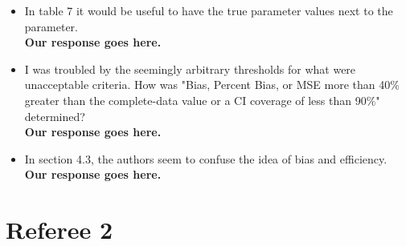 \documentclass[letterpaper,12pt]{article}\usepackage[]{graphicx}\usepackage[]{color}
\begin{document}
\begin{itemize}
{\bf Our response goes here.}\\

\item In table 7 it would be useful to have the true parameter values next to the parameter.\\

{\bf Our response goes here.}\\

\item I was troubled by the seemingly arbitrary thresholds for what were unacceptable criteria. How was "Bias, Percent Bias, or MSE more than 40\% greater than the complete-data value or a CI coverage of less than 90\%" determined?\\

{\bf Our response goes here.}\\

\item In section 4.3, the authors seem to confuse the idea of bias and efficiency.\\

{\bf Our response goes here.}\\
\end{itemize}

\section{Referee 2}
\end{document}
